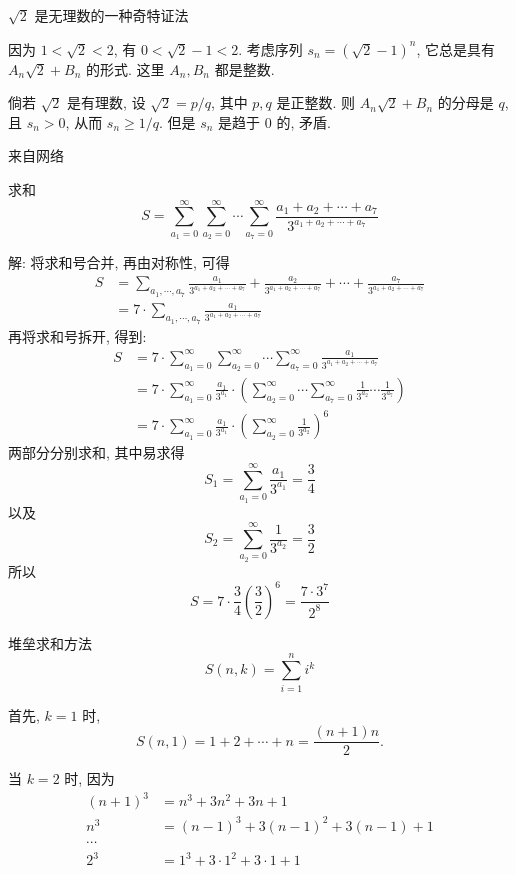 \newpage
\noindent $\sqrt{2}$ 是无理数的一种奇特证法

因为 $1<\sqrt{2}<2$, 有 $0<\sqrt{2}-1<2$. 考虑序列 $s_n = (\sqrt{2}-1)^n$, 它总是具有 $A_n\sqrt{2}+B_n$ 的形式. 这里 $A_n, B_n$ 都是整数.

倘若 $\sqrt{2}$ 是有理数, 设 $\sqrt{2} = p/q$, 其中 $p,q$ 是正整数. 则 $A_n\sqrt{2}+B_n$ 的分母是 $q$, 且 $s_n>0$, 从而 $s_n \ge 1/q$. 但是 $s_n$ 是趋于 0 的, 矛盾.

\newpage

\noindent 来自网络

求和
\[ 
S = \sum_{a_1=0}^{\infty}\sum_{a_2=0}^{\infty}\cdots\sum_{a_7=0}^{\infty}{\frac{a_1+a_2+\cdots+a_7}{3^{a_1+a_2+\cdots+a_7}}}
\]

解: 将求和号合并, 再由对称性, 可得
\begin{align*}
S &= \sum_{a_1,\cdots,a_7} {\frac{a_1}{3^{a_1+a_2+\cdots+a_7}} + \frac{a_2}{3^{a_1+a_2+\cdots+a_7}} + \cdots + \frac{a_7}{3^{a_1+a_2+\cdots+a_7}}} \\
 &= 7\cdot\sum_{a_1,\cdots,a_7} {\frac{a_1}{3^{a_1+a_2+\cdots+a_7}}}
\end{align*}
再将求和号拆开, 得到:
\begin{align*}
S &= 7\cdot \sum_{a_1=0}^{\infty}\sum_{a_2=0}^{\infty}\cdots\sum_{a_7=0}^{\infty}{\frac{a_1}{3^{a_1+a_2+\cdots+a_7}}} \\
&=  7\cdot \sum_{a_1=0}^{\infty}\frac{a_1}{3^{a_1}}\cdot\left(\sum_{a_2=0}^{\infty}\cdots\sum_{a_7=0}^{\infty}{\frac{1}{3^{a_2}}\cdots\frac{1}{3^{a_7}}}\right)\\
&= 7\cdot \sum_{a_1=0}^{\infty}\frac{a_1}{3^{a_1}}\cdot\left(\sum_{a_2=0}^{\infty}{\frac{1}{3^{a_2}}}\right)^6
\end{align*}
两部分分别求和, 其中易求得
\[
S_1 = \sum_{a_1=0}^{\infty}\frac{a_1}{3^{a_1}} = \frac{3}{4}
\]
以及 
\[ S_2 = \sum_{a_2=0}^{\infty}\frac{1}{3^{a_2}} = \frac{3}{2}
\]
所以 
\[
S = 7\cdot\frac{3}{4}(\frac{3}{2})^6 = \frac{7\cdot 3^7}{2^8}
\]


\newpage

\noindent 堆垒求和方法
\[ S(n,k) = \sum_{i=1}^{n}{i^k} \]

首先, $ k = 1 $ 时, \[ S(n,1) = 1 + 2 + \cdots + n = \frac{(n+1)n}{2} .\]

当 $ k = 2 $ 时, 因为
\begin{align*}
(n+1)^3 &= n^3 + 3n^2 + 3n + 1 \\ 
n^3 &= (n-1)^3 + 3(n-1)^2 + 3(n-1) + 1\\
\cdots & \\
 2^3 &= 1^3 + 3\cdot 1^2 + 3\cdot 1 + 1
\end{align*}

